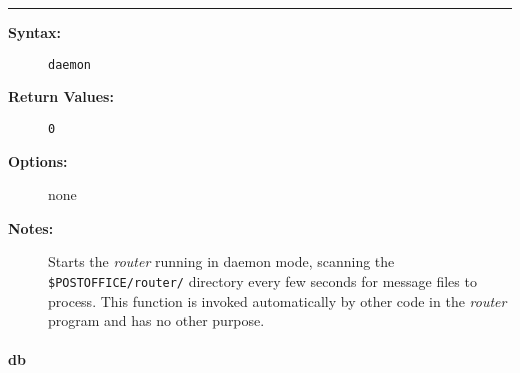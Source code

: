 \hrule
\begin{description}
\item[{\bf Syntax:}] \mbox{}

{\tt daemon}

\item[{\bf Return Values:}] \mbox{}

\begin{description}
\item[{\tt 0}] \mbox{}



\end{description}


\item[{\bf Options:}] \mbox{}

none  

\item[{\bf Notes:}] \mbox{}

Starts the {\em router\/} running in daemon mode, 
scanning the {\tt \$POSTOFFICE/router/} directory every few 
seconds for message files to process. This function is invoked 
automatically by other code in the {\em router\/} program and has no 
other purpose.

\end{description}


\vspace {2pt}


\paragraph{db}

